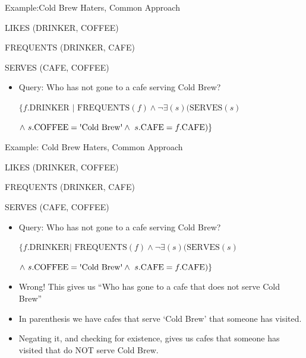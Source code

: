 \documentclass[aspectratio=169]{beamer}
\begin{document}
\begin{frame}{Example:Cold Brew  Haters, Common Approach}

LIKES (DRINKER, COFFEE)

FREQUENTS (DRINKER, CAFE)

SERVES (CAFE, COFFEE)

\begin{itemize}
\item Query: Who has not gone to a cafe serving Cold Brew?

\vspace{10 pt}
$\{f.\textrm{DRINKER } | \textrm{ FREQUENTS}(f) \wedge \neg \exists(s)(\textrm{SERVES}(s)$

$\wedge\ s.\textrm{COFFEE} = \textrm{\textquotesingle{Cold} Brew\textquotesingle}
	\wedge\ s.\textrm{CAFE} = f.\textrm{CAFE})\}$
\end{itemize}
\end{frame}

\begin{frame}{Example: Cold Brew  Haters, Common Approach}

LIKES (DRINKER, COFFEE)

FREQUENTS (DRINKER, CAFE)

SERVES (CAFE, COFFEE)

\begin{itemize}
\item Query: Who has not gone to a cafe serving Cold Brew?

\vspace{10 pt}
$\{f.\textrm{DRINKER} | \textrm{ FREQUENTS}(f) \wedge \neg \exists(s)(\textrm{SERVES}(s)$

$\wedge\ s.\textrm{COFFEE} = \textrm{\textquotesingle{Cold} Brew\textquotesingle}
	\wedge\ s.\textrm{CAFE} = f.\textrm{CAFE})\}$
\end{itemize}

\vspace{10 pt}
\begin{itemize}
\item Wrong!  This gives us ``Who has gone to a cafe that does not serve Cold Brew''

\item In parenthesis we have cafes that serve `Cold Brew' that someone has visited.

\item Negating it, and checking for existence, gives us cafes that someone has visited that do NOT serve Cold Brew.
\end{itemize}


\end{frame}
\end{document}
